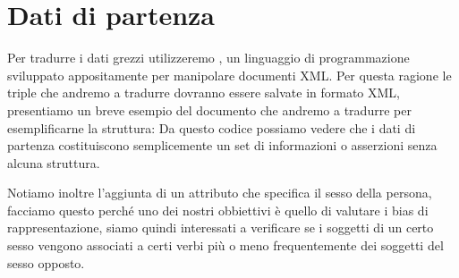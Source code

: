 \section{Dati di partenza}
	Per tradurre i dati grezzi utilizzeremo \cduce, un linguaggio di programmazione sviluppato appositamente per manipolare documenti XML.  Per questa ragione le triple che andremo a tradurre dovranno essere salvate in formato XML, presentiamo un breve esempio del documento che andremo a tradurre per esemplificarne la struttura:
	Da questo codice possiamo vedere che i dati di partenza costituiscono semplicemente un set di informazioni o asserzioni senza alcuna struttura.
	
	Notiamo inoltre l'aggiunta di  un attributo che specifica il sesso della persona, facciamo questo perché uno dei nostri obbiettivi è quello di valutare i bias di rappresentazione, siamo quindi interessati a verificare se i soggetti  di un certo sesso vengono associati a certi verbi più o meno frequentemente dei soggetti del sesso opposto.
